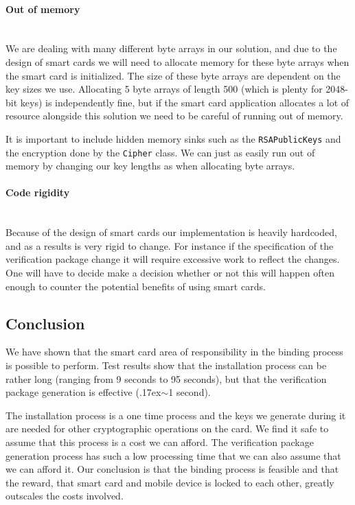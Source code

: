 \paragraph{Out of memory}\mbox{}\\
We are dealing with many different byte arrays in our solution, and due to the design of smart cards we will need to allocate memory for these byte arrays when the smart card is initialized. The size of these byte arrays are dependent on the key sizes we use. Allocating 5 byte arrays of length 500 (which is plenty for 2048-bit keys) is independently fine, but if the smart card application allocates a lot of resource alongside this solution we need to be careful of running out of memory.

It is important to include hidden memory sinks such as the \texttt{RSAPublicKeys} and the encryption done by the \texttt{Cipher} class. We can just as easily run out of memory by changing our key lengths as when allocating byte arrays.

\paragraph{Code rigidity}\mbox{}\\
Because of the design of smart cards our implementation is heavily hardcoded, and as a results is very rigid to change. For instance if the specification of the verification package change it will require excessive work to reflect the changes. One will have to decide make a decision whether or not this will happen often enough to counter the potential benefits of using smart cards.

\subsection{Conclusion}
We have shown that the smart card area of responsibility in the binding process is possible to perform. Test results show that the installation process can be rather long (ranging from 9 seconds to 95 seconds), but that the verification package generation is effective ({\raise.17ex\hbox{$\scriptstyle\sim$}}1 second).

The installation process is a one time process and the keys we generate during it are needed for other cryptographic operations on the card. We find it safe to assume that this process is a cost we can afford. The verification package generation process has such a low processing time that we can also assume that we can afford it. Our conclusion is that the binding process is feasible and that the reward, that smart card and mobile device is locked to each other, greatly outscales the costs involved.
